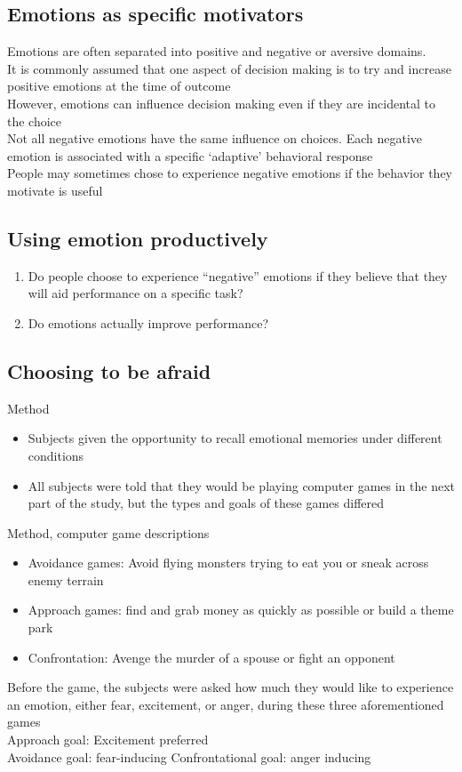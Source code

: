 \subsection{Emotions as specific motivators}
Emotions are often separated into positive and negative or aversive domains.
\\It is commonly assumed that one aspect of decision making is to try and increase
positive emotions at the time of outcome
\\However, emotions can influence decision making even if they are incidental to the
choice
\\Not all negative emotions have the same influence on choices. Each negative emotion is
associated with a specific ‘adaptive’ behavioral response
\\People may sometimes chose to experience negative emotions if the behavior they
motivate is useful

\subsection{Using emotion productively}
\begin{enumerate}
    \item Do people choose to experience “negative” emotions if they believe that they will aid
performance on a specific task?
\item Do emotions actually improve performance?
\end{enumerate}

\subsection{Choosing to be afraid}
Method
\begin{itemize}
    \item Subjects given the opportunity to recall emotional memories under different conditions
    \item All subjects were told that they would be playing computer games in the next part of the study, but the types and goals of these games differed
\end{itemize}
    Method, computer game descriptions
    \begin{itemize}
        \item Avoidance games: Avoid flying monsters trying to eat you or sneak across enemy terrain
        \item Approach games: find and grab money as quickly as possible or build a theme park
        \item Confrontation: Avenge the murder of a spouse or fight an opponent
        
    \end{itemize}
Before the game, the subjects were asked how much they would like to experience an emotion, either fear, excitement, or anger, during these three aforementioned games
\\Approach goal: Excitement preferred
\\Avoidance goal: fear-inducing
Confrontational goal: anger inducing
